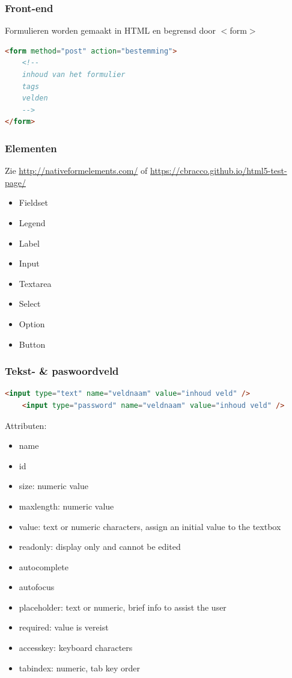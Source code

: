 \documentclass{article}
\begin{document}
\subsubsection{Front-end}
Formulieren worden gemaakt in HTML en begrensd door $<$form$>$

\begin{lstlisting}[language=HTML]
<form method="post" action="bestemming">
    <!--
    inhoud van het formulier
    tags
    velden
    -->
</form>
\end{lstlisting}

\subsubsection{Elementen}
Zie \url{http://nativeformelements.com/} of \url{https://cbracco.github.io/html5-test-page/}
\begin{itemize}
    \item Fieldset
    \item Legend
    \item Label
    \item Input
    \item Textarea
    \item Select
    \item Option
    \item Button
\end{itemize}

\subsubsection{Tekst- \& paswoordveld}
\begin{lstlisting}[language=HTML]
    <input type="text" name="veldnaam" value="inhoud veld" />
    <input type="password" name="veldnaam" value="inhoud veld" />
\end{lstlisting}

Attributen:
\begin{itemize}
    \item name
    \item id
    \item size: numeric value
    \item maxlength: numeric value
    \item value: text or numeric characters, assign an initial value to the textbox
    \item readonly: display only and cannot be edited
    \item autocomplete
    \item autofocus
    \item placeholder: text or numeric, brief info to assist the user
    \item required: value is vereist
    \item accesskey: keyboard characters
    \item tabindex: numeric, tab key order
\end{itemize}
\end{document}
